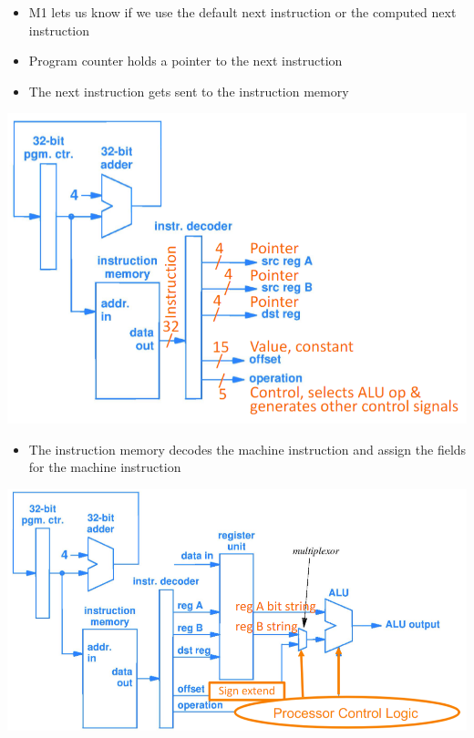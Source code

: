 \documentclass{article}
\begin{document}
\begin{itemize}
    \item M1 lets us know if we use the default next instruction or the computed next instruction
    
    \item Program counter holds a pointer to the next instruction 
    
    \item The next instruction gets sent to the instruction memory
\end{itemize}

\includegraphics[scale=0.35]{images/6.9 pt 2.png}

\begin{itemize}
    \item The instruction memory decodes the machine instruction and assign the fields for the machine instruction 
    
\end{itemize}
 
 
 \includegraphics[scale=0.35]{images/6.9 pt 3.png}
 
\end{document}
